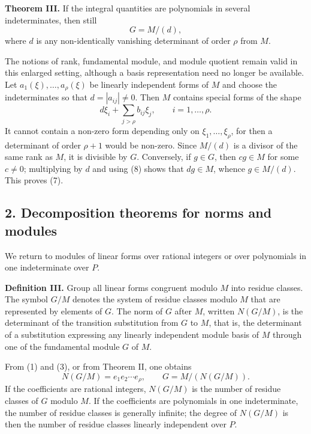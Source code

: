 \documentclass[11pt]{article}
\begin{document}
\textbf{Theorem III.} If the integral quantities are polynomials in several indeterminates, then still
\begin{equation}
  G=M/(d),                                                         \tag{7}
\end{equation}
where $d$ is any non-identically vanishing determinant of order $\rho$ from $M$.

The notions of rank, fundamental module, and module quotient remain valid in this enlarged setting, although a basis representation need no longer be available. Let $a_1(\xi),\ldots,a_\rho(\xi)$ be linearly independent forms of $M$ and choose the indeterminates so that $d=|a_{ij}|\ne0$. Then $M$ contains special forms of the shape
\begin{equation}
  d\xi_i+\sum_{j>\rho} b_{ij}\xi_j,
  \qquad i=1,\ldots,\rho.                                        \tag{8}
\end{equation}
It cannot contain a non-zero form depending only on $\xi_1,\ldots,\xi_\rho$, for then a determinant of order $\rho+1$ would be non-zero. Since $M/(d)$ is a divisor of the same rank as $M$, it is divisible by $G$. Conversely, if $g\in G$, then $c g\in M$ for some $c\ne0$; multiplying by $d$ and using (8) shows that $dg\in M$, whence $g\in M/(d)$. This proves (7).

\subsection{2. Decomposition theorems for norms and modules}

We return to modules of linear forms over rational integers or over polynomials in one indeterminate over $P$.

\textbf{Definition III.} Group all linear forms congruent modulo $M$ into residue classes. The symbol $G/M$ denotes the system of residue classes modulo $M$ that are represented by elements of $G$. The norm of $G$ after $M$, written $N(G/M)$, is the determinant of the transition substitution from $G$ to $M$, that is, the determinant of a substitution expressing any linearly independent module basis of $M$ through one of the fundamental module $G$ of $M$.

From (1) and (3), or from Theorem II, one obtains
\begin{equation}
  N(G/M)=e_1e_2\cdots e_\rho,
  \qquad
  G=M/(N(G/M)).                                                     \tag{9}
\end{equation}
If the coefficients are rational integers, $N(G/M)$ is the number of residue classes of $G$ modulo $M$. If the coefficients are polynomials in one indeterminate, the number of residue classes is generally infinite; the degree of $N(G/M)$ is then the number of residue classes linearly independent over $P$.
\end{document}
